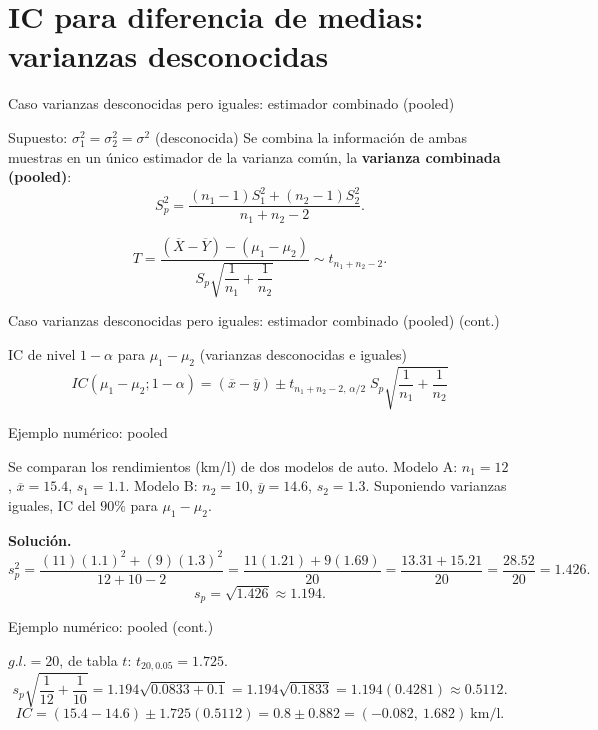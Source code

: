 \documentclass[aspectratio=169,11pt]{beamer}
\begin{document}
\section{IC para diferencia de medias: varianzas desconocidas}

\begin{frame}{Caso varianzas desconocidas pero iguales: estimador combinado (pooled)}
\begin{block}{Supuesto: $\sigma_1^2=\sigma_2^2=\sigma^2$ (desconocida)}
Se combina la información de ambas muestras en un único estimador de la varianza común, la \textbf{varianza combinada (pooled)}:
\[
S_p^2 = \frac{(n_1-1)S_1^2 + (n_2-1)S_2^2}{n_1+n_2-2}.
\]
\end{block}

\begin{theorem}
\[
T = \frac{(\overline X-\overline Y)-(\mu_1-\mu_2)}{S_p\sqrt{\dfrac{1}{n_1}+\dfrac{1}{n_2}}} \sim t_{n_1+n_2-2}.
\]
\end{theorem}

\end{frame}

\begin{frame}{Caso varianzas desconocidas pero iguales: estimador combinado (pooled) (cont.)}
\begin{alertblock}{IC de nivel $1-\alpha$ para $\mu_1-\mu_2$ (varianzas desconocidas e iguales)}
\[
IC(\mu_1-\mu_2;1-\alpha) = (\overline x-\overline y) \pm t_{n_1+n_2-2,\,\alpha/2}\; S_p\sqrt{\frac{1}{n_1}+\frac{1}{n_2}}
\]
\end{alertblock}
\end{frame}

\begin{frame}{Ejemplo numérico: pooled}
\begin{example}
Se comparan los rendimientos (km/l) de dos modelos de auto. Modelo A: $n_1=12$, $\overline x=15.4$, $s_1=1.1$. Modelo B: $n_2=10$, $\overline y=14.6$, $s_2=1.3$. Suponiendo varianzas iguales, IC del $90\%$ para $\mu_1-\mu_2$.

\textbf{Solución.}
\[
s_p^2 = \frac{(11)(1.1)^2+(9)(1.3)^2}{12+10-2} = \frac{11(1.21)+9(1.69)}{20} = \frac{13.31+15.21}{20} = \frac{28.52}{20}=1.426.
\]
\[
s_p = \sqrt{1.426}\approx 1.194.
\]
\end{example}
\end{frame}

\begin{frame}{Ejemplo numérico: pooled (cont.)}
\begin{example}
$g.l.=20$, de tabla $t$: $t_{20,0.05}=1.725$.
\[
s_p\sqrt{\frac1{12}+\frac1{10}} = 1.194\sqrt{0.0833+0.1}=1.194\sqrt{0.1833}=1.194(0.4281)\approx 0.5112.
\]
\[
IC=(15.4-14.6)\pm 1.725(0.5112) = 0.8\pm 0.882 = (-0.082,\ 1.682)\ \text{km/l}.
\]
\end{example}
\end{frame}
\end{document}
